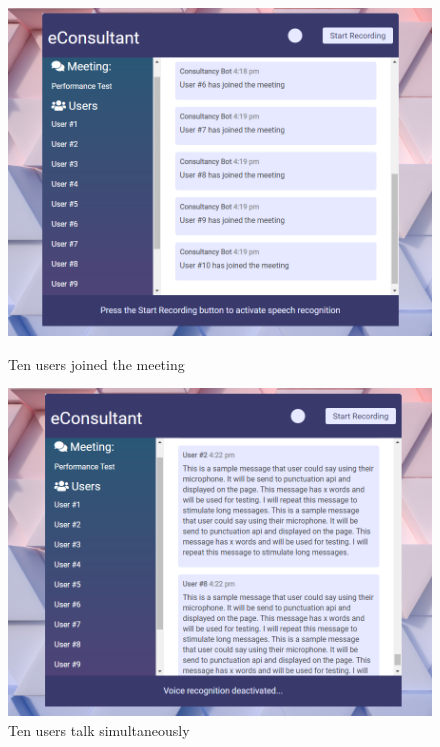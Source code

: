 \documentclass{article}
\begin{document}
\vspace{10pt}
\begin{figure}[H]
\centering
\begin{minipage}{.48\textwidth}
  \centering
  \includegraphics[width=1\linewidth]{implementation/performanceTest1.png}
  \caption{Ten users joined the meeting}
  \label{fig:performanceTest1}
\end{minipage}
\begin{minipage}{.48\textwidth}
  \centering
  \includegraphics[width=1\linewidth]{implementation/performanceTest2.png}
  \caption{Ten users talk simultaneously}
  \label{fig:performanceTest2}
\end{minipage}
\end{figure}
\end{document}
